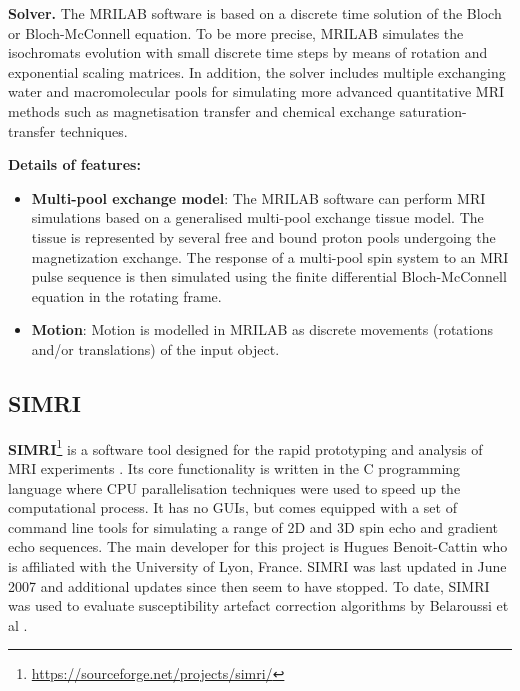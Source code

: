 \hfill

\textbf{Solver.} The MRILAB software is based on a discrete time solution of the Bloch or Bloch-McConnell equation.
To be more precise, MRILAB simulates the isochromats evolution with small discrete time steps by means of rotation and exponential scaling matrices. 
In addition, the solver includes multiple exchanging water and macromolecular pools for simulating more advanced quantitative MRI methods such as magnetisation transfer and chemical exchange saturation-transfer techniques.

\hfill

\textbf{Details of features:}
\begin{itemize}
    
    \item \textbf{Multi-pool exchange model}: The MRILAB software can perform MRI simulations based on a generalised multi-pool exchange tissue model. 
    The tissue is represented by several free and bound proton pools undergoing the magnetization exchange.
    The response of a multi-pool spin system to an MRI pulse sequence is then simulated using the finite differential Bloch-McConnell equation in the rotating frame.
    
    \item \textbf{Motion}: Motion is modelled in MRILAB as discrete movements (rotations and/or translations) of the input object.
    
\end{itemize}

\hfill

\subsection{SIMRI}
\textbf{SIMRI}\footnote{\url{https://sourceforge.net/projects/simri/}} is a software tool designed for the rapid prototyping and analysis of MRI experiments \cite{Benoit-Cattin2005}.
Its core functionality is written in the C programming language where CPU parallelisation techniques were used to speed up the computational process.
It has no GUIs, but comes equipped with a set of command line tools for simulating a range of 2D and 3D spin echo and gradient echo sequences.
The main developer for this project is Hugues Benoit-Cattin who is affiliated with the University of Lyon, France.
SIMRI was last updated in June 2007 and additional updates since then seem to have stopped.
To date, SIMRI was used to evaluate susceptibility artefact correction algorithms by Belaroussi et al \cite{Belaroussi2004}.

